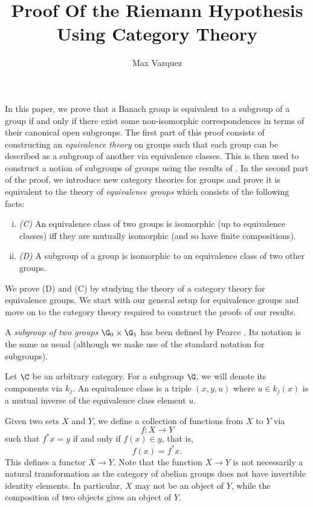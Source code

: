 \documentclass[a4paper,reqno,oneside]{article}
\begin{document}
\title{Proof Of the Riemann Hypothesis Using Category Theory}
\author{Max Vazquez}
\maketitle


In this paper, we prove that a Banach group is equivalent to a subgroup of a group if and only if there exist some non-isomorphic correspondences in terms of their canonical open subgroups. The first part of this proof consists of constructing an \emph{equivalence theory} on groups such that each group can be described as a subgroup of another via equivalence classes. This is then used to construct a notion of subgroups of groups using the results of \cite{Winkler2020}.  In the second part of the proof, we introduce new category theories for groups and prove it is equivalent to the theory of \emph{equivalence groups} which consists of the following facts: 
\begin{enumerate}[(i)]
\item \emph{(C)} An equivalence class of two groups is isomorphic (up to equivalence classes) iff they are mutually isomorphic (and so have finite compositions). 
\item \emph{(D)} A subgroup of a group is isomorphic to an equivalence class of two other groups. 
\end{enumerate}
We prove (D) and (C) by studying the theory of a category theory for equivalence groups. We start with our general setup for equivalence groups and move on to the category theory required to construct the proofs of our results. 


A \emph{subgroup of two groups $\G_0 \times \G_1$} has been defined by Pearce \cite[Definition 3.26]{pearce:homological_geometry}. Its notation is the same as usual (although we make use of the standard notation for subgroups). 

Let $\C$ be an arbitrary category. For a subgroup $\G$, we will denote its components via $k_j$. An equivalence class is a triple $(x,y,u)$ where $u \in k_j(x)$ is a mutual inverse of the equivalence class element $u$.  

Given two sets $X$ and $Y$, we define a collection of functions from $X$ to $Y$ via
\[
f: X \to Y
\]
such that $f^* x = y$ if and only if $f(x) \in y$, that is,
\[
f(x) = f^*x.
\]
This defines a functor $X \to Y$. Note that the function $X \to Y$ is not necessarily a natural transformation as the category of abelian groups does not have invertible identity elements. In particular, $X$ may not be an object of $Y$, while the composition of two objects gives an object of $Y$.
\end{document}
